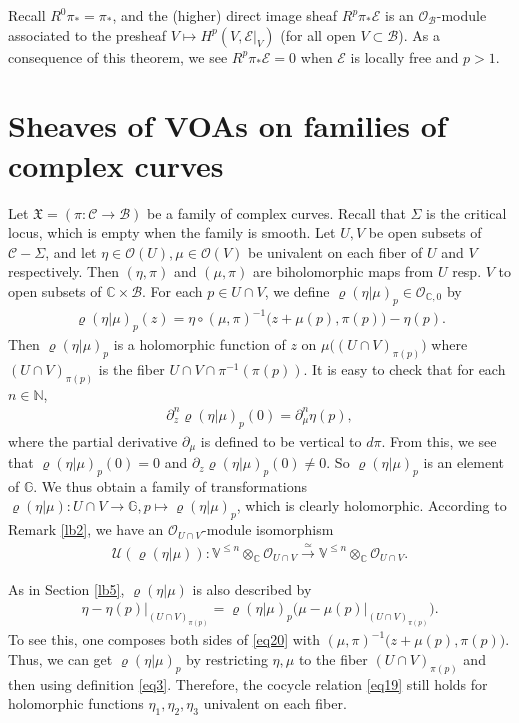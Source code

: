 \documentclass[12pt,a4paper,notitlepage]{article}
\theoremstyle{definition}
\theoremstyle{plain}
\newcommand{\fk}{\mathfrak}
\newcommand{\mc}{\mathcal}
\newcommand{\scr}{\mathscr}
\newcommand{\Vbb}{\mathbb V}
\newcommand{\Gbb}{\mathbb G}
\newcommand{\Cbb}{\mathbb C}
\newcommand{\Nbb}{\mathbb N}
\numberwithin{equation}{section}
\begin{document}
Recall  $R^0\pi_*=\pi_*$, and the (higher) direct image sheaf $R^p\pi_*\scr E$ is an $\scr O_{\mc B}$-module associated to the presheaf $V\mapsto H^p(V,\scr E|_V)$ (for all open $V\subset\mc B$). As a consequence of this theorem, we see $R^p\pi_*\scr E=0$ when $\scr E$ is locally free and $p>1$.



\section{Sheaves of VOAs on families of complex curves}\label{lb23}



Let $\fk X=(\pi:\mc C\rightarrow\mc B)$ be a family of complex curves. Recall that $\Sigma$ is the critical locus, which is empty when the family is smooth. Let $U,V$ be open subsets of $\mc C-\Sigma$, and let $\eta\in\scr O(U),\mu\in\scr O(V)$ be univalent on each fiber of $U$ and $V$ respectively. Then  $(\eta,\pi)$ and $(\mu,\pi)$ are biholomorphic maps from $U$ resp. $V$ to open subsets of $\Cbb\times\mc B$.   For each $p\in U\cap V$, we define $\varrho(\eta|\mu)_p\in\scr O_{\Cbb,0}$ by
\begin{align}
\varrho(\eta|\mu)_p(z)=\eta\circ(\mu,\pi)^{-1}\big(z+\mu(p),\pi(p)\big)-\eta(p).
\end{align}
Then $\varrho(\eta|\mu)_p$ is a holomorphic function of $z$ on  $\mu\big((U\cap V)_{\pi(p)}\big)$ where $(U\cap V)_{\pi(p)}$ is the fiber $U\cap V\cap \pi^{-1}(\pi(p))$. It is easy to check that for each $n\in\Nbb$,
\begin{align}
\partial_z^n\varrho(\eta|\mu)_p(0)=\partial_\mu^n \eta(p),
\end{align}
where the partial derivative $\partial_\mu$ is defined to be vertical to $d\pi$. From this, we see that $\varrho(\eta|\mu)_p(0)=0$ and  $\partial_z\varrho(\eta|\mu)_p(0)\neq0$. So $\varrho(\eta|\mu)_p$ is an element of $\Gbb$. We thus obtain a family of transformations $\varrho(\eta|\mu):U\cap V\rightarrow\Gbb,p\mapsto \varrho(\eta|\mu)_p$, which  is clearly holomorphic. According to Remark \ref{lb2},  we have an $\scr O_{U\cap V}$-module isomorphism
\begin{align*}
\mc U(\varrho(\eta|\mu)):\Vbb^{\leq n}\otimes_\Cbb\scr O_{U\cap V}\xrightarrow{\simeq} \Vbb^{\leq n}\otimes_\Cbb\scr O_{U\cap V}.
\end{align*}

As in Section \ref{lb5}, $\varrho(\eta|\mu)$ is also described by
\begin{align}
\eta-\eta(p)\big|_{(U\cap V)_{\pi(p)}}=\varrho(\eta|\mu)_p\big(\mu-\mu(p)\big|_{(U\cap V)_{\pi(p)}}\big).\label{eq20}
\end{align}
To see this, one composes both sides of \eqref{eq20} with $(\mu,\pi)^{-1}\big(z+\mu(p),\pi(p)\big)$.  Thus, we can get $\varrho(\eta|\mu)_p$ by restricting $\eta,\mu$ to the fiber $(U\cap V)_{\pi(p)}$ and then using definition \eqref{eq3}. Therefore, the cocycle relation \eqref{eq19} still holds for holomorphic functions $\eta_1,\eta_2,\eta_3$ univalent on each fiber.
\end{document}
